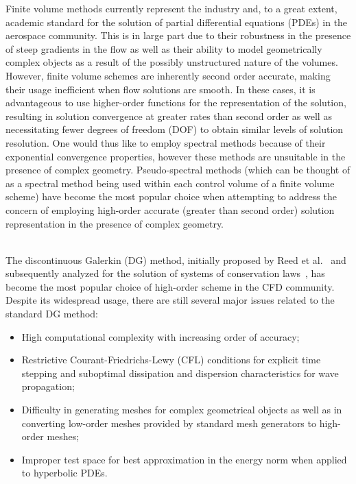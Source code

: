\documentclass[12pt,Bold,letterpaper,TexShade]{mcgilletdclass}
\numberwithin{equation}{section}
\begin{document}
Finite volume methods currently represent the industry and, to a great extent, academic standard for the solution of partial differential equations (PDEs) in the aerospace community. This is in large part due to their robustness in the presence of steep gradients in the flow as well as their ability to model geometrically complex objects as a result of the possibly unstructured nature of the volumes. However, finite volume schemes are inherently second order accurate, making their usage inefficient when flow solutions are smooth. In these cases, it is advantageous to use higher-order functions for the representation of the solution, resulting in solution convergence at greater rates than second order as well as necessitating fewer degrees of freedom (DOF) to obtain similar levels of solution resolution. One would thus like to employ spectral methods because of their exponential convergence properties, however these methods are unsuitable in the presence of complex geometry. Pseudo-spectral methods (which can be thought of as a spectral method being used within each control volume of a finite volume scheme) have become the most popular choice when attempting to address the concern of employing high-order accurate (greater than second order) solution representation in the presence of complex geometry. 
\\~

The discontinuous Galerkin (DG) method, initially proposed by Reed et al.~\cite{reed1973} and subsequently analyzed for the solution of systems of conservation laws~\cite{cockburn1991,cockburn1989a,cockburn1989b,cockburn1990,cockburn1998}, has become the most popular choice of high-order scheme in the CFD community.  Despite its widespread usage, there are still several major issues related to the standard DG method:

\begin{itemize}
\item High computational complexity with increasing order of accuracy;
\item Restrictive Courant-Friedrichs-Lewy (CFL) conditions for explicit time stepping and suboptimal dissipation and dispersion characteristics for wave propagation;
\item Difficulty in generating meshes for complex geometrical objects as well as in converting low-order meshes provided by standard mesh generators to high-order meshes;
\item Improper test space for best approximation in the energy norm when applied to hyperbolic PDEs. %
\end{itemize}
\end{document}
